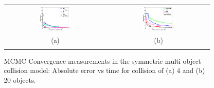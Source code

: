 \documentclass[letterpaper]{article}
\newcommand{\nnn}{0.33}
\newcommand{\nnh}{0.23}
\begin{document}
\begin{figure}[t!]
\vspace{-0mm}
\begin{center}
\begin{tabular}{cc}
   \hspace{-5mm} \includegraphics[width=\nnn\textwidth, height=\nnh\textwidth]{plotsx/collisionx/err-vs-time__param5-shaded.pdf} 
& \hspace{-3mm} \includegraphics[width=\nnn\textwidth, height=\nnh\textwidth]{plotsx/collisionx/err-vs-time__param15-shaded.pdf} 
\vspace{-1.5mm}
\\
\hspace{-5mm} \footnotesize(a) 
& \hspace{-4mm} \footnotesize(b) 
\\
\multicolumn{2}{c}{}
\end{tabular}
\end{center}
\vspace{-6mm}
\caption{\footnotesize 
MCMC Convergence measurements in the symmetric multi-object collision model: 
Absolute error vs time for collision of (a) 4 and (b) 20 objects.}
\label{fig:multi-object.mom}
\vspace{-2mm}
\end{figure}
\end{document}
